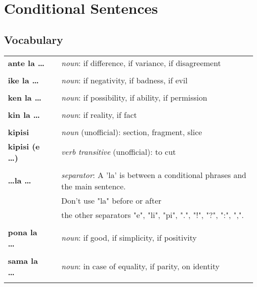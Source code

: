 \section{Conditional Sentences}
%
\subsection*{Vocabulary}
%
\begin{supertabular}{p{2,5cm}|ll}
%
\textbf{ante la \dots} && \textit{noun}: if difference, if variance, if disagreement  \\ %
 && \\ %
%
\textbf{ike la \dots} && \textit{noun}: if negativity, if badness, if evil \\ %
 && \\ %
%
\textbf{ken la \dots} && \textit{noun}: if possibility, if ability, if permission \\ %
 && \\ %
%
\textbf{kin la \dots} && \textit{noun}: if reality, if fact \\  %
 && \\ %
%
\textbf{kipisi} && \textit{noun} (unofficial): section, fragment, slice \\ %
\textbf{kipisi (e \dots)} && \textit{verb transitive} (unofficial): to cut \\ %
 && \\ %
%
\textbf{\dots la \dots} && \textit{separator}: A 'la' is between a conditional phrases and the main sentence. \\ &&  Don't use "la" before or after \\ && the other separators "e", "li", "pi", ".", "!", "?", ":", ",".  \\ %
 && \\ %
%
\textbf{pona la \dots} && \textit{noun}: if good, if simplicity, if positivity \\ %
 && \\ %
%
\textbf{sama la \dots} && \textit{noun}: in case of equality, if parity, on identity  \\  
 && \\ %
%
\end{supertabular} \\
%
\newpage
%

